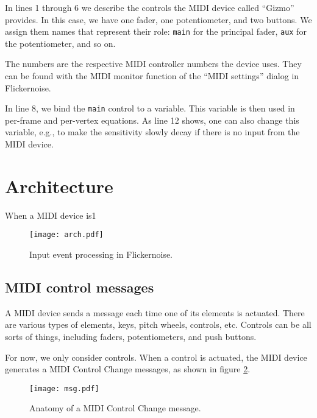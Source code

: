 \documentclass[11pt,a4paper]{article}
\begin{document}
In lines 1 through 6 we describe the controls the MIDI device called
``Gizmo'' provides. In this case, we have one fader, one potentiometer,
and two buttons. We assign them names that represent their role: {\tt main}
for the principal fader, {\tt aux} for the potentiometer, and so on.

The numbers are the respective MIDI controller numbers the device uses.
They can be found with the MIDI monitor function of the ``MIDI settings''
dialog in Flickernoise.

In line 8, we bind the {\tt main} control to a variable. This variable is
then used in per-frame and per-vertex equations. As line 12 shows, one
can also change this variable, e.g., to make the sensitivity slowly decay
if there is no input from the MIDI device.




\section{Architecture}

When a MIDI device is1
\begin{figure}[!tb]
\begin{center}
\texttt{[image: arch.pdf]}
\end{center}
\caption{Input event processing in Flickernoise.}
\label{arch}
\end{figure}




\subsection{MIDI control messages}

A MIDI device sends a message each time one of its elements is actuated.
There are various types of elements, keys, pitch wheels, controls, etc.
Controls can be all sorts of things, including faders, potentiometers,
and push buttons.

For now, we only consider controls. When a control is actuated, the
MIDI device generates a MIDI Control Change messages, as shown in
figure \ref{msg}.

\begin{figure}[!tb]
\begin{center}
\texttt{[image: msg.pdf]}
\end{center}
\caption{Anatomy of a MIDI Control Change message.}
\label{msg}
\end{figure}
\end{document}
